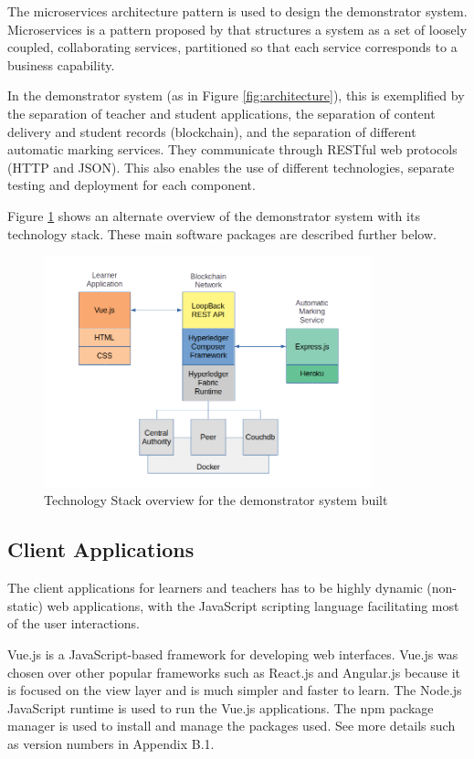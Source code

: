 The microservices architecture pattern is used to design the demonstrator system. Microservices is a pattern proposed by
\citet{richardson2018ms} that structures a system as a set of loosely coupled, collaborating services, partitioned so that
each service corresponds to a business capability.

In the demonstrator system (as in Figure \ref{fig:architecture}), this is exemplified by the separation of teacher and student applications,
the separation of content delivery and student records (blockchain), and the separation of different automatic marking services.
They communicate through RESTful web protocols (HTTP and JSON).
This also enables the use of different technologies, separate testing and deployment for each component.

Figure \ref{fig:techstack} shows an alternate overview of the demonstrator system with its technology stack.
These main software packages are described further below.

\begin{figure}[!ht]
	\centering
	\includegraphics[width=0.85\textwidth]{techstack}
	\caption[Demonstrator Technology Stack]
	{Technology Stack overview for the demonstrator system built}
	\label{fig:techstack}
\end{figure}

\subsection{Client Applications}

The client applications for learners and teachers has to be highly dynamic (non-static) web applications,
with the JavaScript scripting language facilitating most of the user interactions.

Vue.js is a JavaScript-based framework for developing web interfaces. Vue.js was chosen over other
popular frameworks such as React.js and Angular.js because it is focused on the view layer and is much
simpler and faster to learn. The Node.js JavaScript runtime is used to run the Vue.js applications. The npm package manager
is used to install and manage the packages used. See more details such as version numbers in Appendix B.1.

